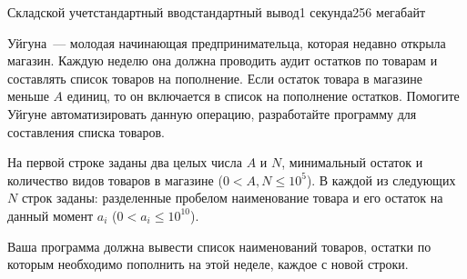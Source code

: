 \begin{problem}{Складской учет}{стандартный ввод}{стандартный вывод}{1 секунда}{256 мегабайт}

Уйгуна~--- молодая начинающая предпринимательца, которая недавно открыла магазин. Каждую неделю она должна проводить аудит остатков по товарам и составлять список товаров на пополнение. Если остаток товара в магазине меньше $A$ единиц, то он включается в список на пополнение остатков. Помогите Уйгуне автоматизировать данную операцию, разработайте программу для составления списка товаров.

\InputFile
На первой строке заданы два целых числа $A$ и $N$, минимальный остаток и количество видов товаров в магазине ($0 < A, N \leq 10^{5}$).
В каждой из следующих $N$ строк заданы: разделенные пробелом наименование товара и его остаток на данный момент $a_i$ ($0<a_i \leq 10^{10}$).

\OutputFile
Ваша программа должна вывести список наименований товаров, остатки по которым необходимо пополнить на этой неделе, каждое с новой строки.

\Example

\begin{example}
%
\end{example}

\end{problem}

